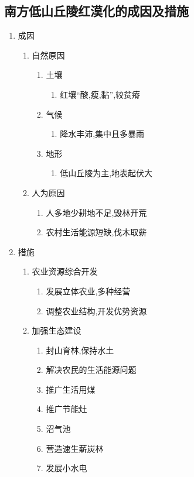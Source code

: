 \documentclass[a4paper]{article}
\begin{document}
    \subsection{南方低山丘陵红漠化的成因及措施}
    \begin{enumerate}
        \item 成因
        \begin{enumerate}
            \item 自然原因
            \begin{enumerate} %
                \item 土壤
                \begin{enumerate}
                    \item 红壤“酸,瘦,黏”,较贫瘠
                \end{enumerate}
                \item 气候
                \begin{enumerate}
                    \item 降水丰沛,集中且多暴雨
                \end{enumerate}
                \item 地形
                \begin{enumerate}
                    \item 低山丘陵为主,地表起伏大
                \end{enumerate}
            \end{enumerate}
            \item 人为原因
            \begin{enumerate}
                \item 人多地少耕地不足,毁林开荒
                \item 农村生活能源短缺,伐木取薪
            \end{enumerate}
        \end{enumerate}
        \item 措施
        \begin{enumerate}
            \item 农业资源综合开发
            \begin{enumerate}
                \item 发展立体农业,多种经营
                \item 调整农业结构,开发优势资源
            \end{enumerate}
            \item 加强生态建设
            \begin{enumerate}
                \item 封山育林,保持水土
                \item 解决农民的生活能源问题
                    \item 推广生活用煤
                    \item 推广节能灶
                    \item 沼气池
                    \item 营造速生薪炭林
                    \item 发展小水电
            \end{enumerate}
        \end{enumerate}
    \end{enumerate}
\end{document}
